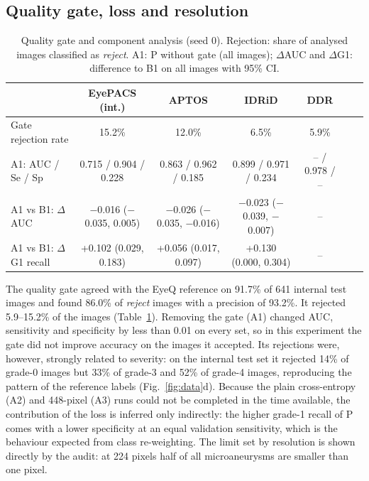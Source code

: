 \documentclass[11pt,a4paper]{article}
\begin{document}
\subsection{Quality gate, loss and resolution}
\begin{table}[t]
\centering\scriptsize
\caption{Quality gate and component analysis (seed 0). Rejection: share of analysed images classified as \emph{reject}. A1: P without gate (all images); $\Delta$AUC and $\Delta$G1: difference to B1 on all images with 95\% CI.}\label{tab:abl}
\begin{tabular}{@{}lcccccc@{}}
\toprule
 & EyePACS (int.) & APTOS & IDRiD & DDR\\\midrule
Gate rejection rate & 15.2\% & 12.0\% & 6.5\% & 5.9\%\\
A1: AUC / Se / Sp & 0.715 / 0.904 / 0.228 & 0.863 / 0.962 / 0.185 & 0.899 / 0.971 / 0.234 & -- / 0.978 / --\\
A1 vs B1: $\Delta$AUC & $-$0.016 ($-$0.035, 0.005) & $-$0.026 ($-$0.035, $-$0.016) & $-$0.023 ($-$0.039, $-$0.007) & --\\
A1 vs B1: $\Delta$G1 recall & +0.102 (0.029, 0.183) & +0.056 (0.017, 0.097) & +0.130 (0.000, 0.304) & --\\
\bottomrule
\end{tabular}
\end{table}
The quality gate agreed with the EyeQ reference on 91.7\% of 641 internal test images and found 86.0\% of \emph{reject} images with a precision of 93.2\%. It rejected 5.9--15.2\% of the images (Table~\ref{tab:abl}). Removing the gate (A1) changed AUC, sensitivity and specificity by less than 0.01 on every set, so in this experiment the gate did not improve accuracy on the images it accepted. Its rejections were, however, strongly related to severity: on the internal test set it rejected 14\% of grade-0 images but 33\% of grade-3 and 52\% of grade-4 images, reproducing the pattern of the reference labels (Fig.~\ref{fig:data}d). Because the plain cross-entropy (A2) and 448-pixel (A3) runs could not be completed in the time available, the contribution of the loss is inferred only indirectly: the higher grade-1 recall of P comes with a lower specificity at an equal validation sensitivity, which is the behaviour expected from class re-weighting. The limit set by resolution is shown directly by the audit: at 224 pixels half of all microaneurysms are smaller than one pixel.
\end{document}
